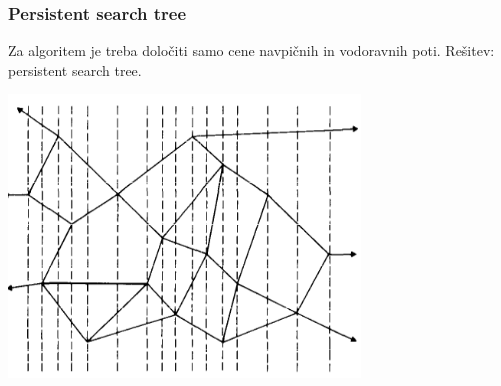 \documentclass{beamer}
\begin{document}
\begin{frame}
    \frametitle{Persistent search tree}

    Za algoritem je treba določiti samo cene navpičnih in vodoravnih poti. Rešitev: persistent search tree.

    \includegraphics[width=0.7\textwidth]{slabs.png}
    
\end{frame}
\end{document}
